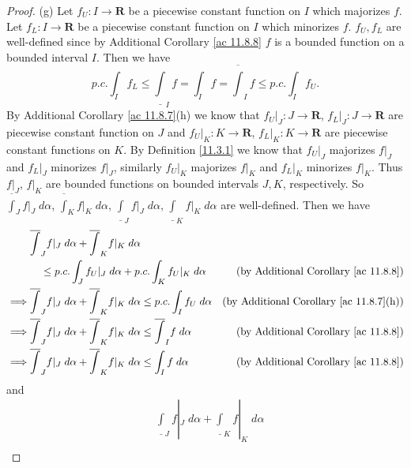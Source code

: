 \begin{proof}{(g)}
    Let \(f_U : I \to \mathbf{R}\) be a piecewise constant function on \(I\) which majorizes \(f\).
    Let \(f_L : I \to \mathbf{R}\) be a piecewise constant function on \(I\) which minorizes \(f\).
    \(f_U, f_L\) are well-defined since by Additional Corollary \ref{ac 11.8.8} \(f\) is a bounded function on a bounded interval \(I\).
    Then we have
    \[
        p.c. \int_I f_L \leq \underline{\int}_I f = \int_I f = \overline{\int}_I f \leq p.c. \int_I f_U.
    \]
    By Additional Corollary \ref{ac 11.8.7}(h) we know that \(f_U|_J : J \to \mathbf{R}\), \(f_L|_J : J \to \mathbf{R}\) are piecewise constant function on \(J\) and \(f_U|_K : K \to \mathbf{R}\), \(f_L|_K : K \to \mathbf{R}\) are piecewise constant functions on \(K\).
    By Definition \ref{11.3.1} we know that \(f_U|_J\) majorizes \(f|_J\) and \(f_L|_J\) minorizes \(f|_J\), similarly \(f_U|_K\) majorizes \(f|_K\) and \(f_L|_K\) minorizes \(f|_K\).
    Thus \(f|_J\), \(f|_K\) are bounded functions on bounded intervals \(J, K\), respectively.
    So \(\overline{\int}_J f|_J \; d \alpha\), \(\overline{\int}_K f|_K \; d \alpha\), \(\underline{\int}_J f|_J \; d \alpha\), \(\underline{\int}_K f|_K \; d \alpha\) are well-defined.
    Then we have
    \begin{align*}
                 & \overline{\int}_J f|_J \; d \alpha + \overline{\int}_K f|_K \; d \alpha                                                                                            \\
                 & \quad \leq p.c. \int_J f_U|_J \; d \alpha + p.c. \int_K f_U|_K \; d \alpha                                   & \text{(by Additional Corollary \ref{ac 11.8.8})}    \\
        \implies & \overline{\int}_J f|_J \; d \alpha + \overline{\int}_K f|_K \; d \alpha \leq p.c. \int_I f_U \; d \alpha     & \text{(by Additional Corollary \ref{ac 11.8.7}(h))} \\
        \implies & \overline{\int}_J f|_J \; d \alpha + \overline{\int}_K f|_K \; d \alpha \leq \overline{\int}_I f \; d \alpha & \text{(by Additional Corollary \ref{ac 11.8.8})}    \\
        \implies & \overline{\int}_J f|_J \; d \alpha + \overline{\int}_K f|_K \; d \alpha \leq \int_I f \; d \alpha            & \text{(by Additional Corollary \ref{ac 11.8.8})}
    \end{align*}
    and
    \begin{align*}
                 & \underline{\int}_J f|_J \; d \alpha + \underline{\int}_K f|_K \; d \alpha                                                                                             \\

\end{align*}
\end{proof}
